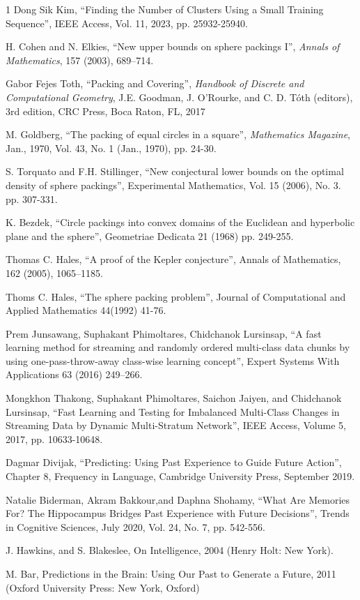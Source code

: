 \documentclass[lettersize,journal]{IEEEtran}
\begin{document}
\begin{thebibliography}{1}
Dong Sik Kim, ``Finding the Number of Clusters Using a Small Training Sequence'', IEEE Access, Vol. 11, 2023,
pp. 25932-25940.
  
H. Cohen and N. Elkies, ``New upper bounds on sphere packings I'', \textit{Annals of Mathematics}, 157 (2003), 
689–714.

Gabor Fejes Toth, ``Packing and Covering'', \textit{Handbook of Discrete and Computational Geometry},
J.E. Goodman, J. O'Rourke, and C. D. Tóth (editors), 3rd edition, CRC Press, Boca Raton, FL, 2017

M. Goldberg, ``The packing of equal circles in a square'', \textit{Mathematics Magazine}, Jan., 1970, 
Vol. 43, No. 1 (Jan., 1970), pp. 24-30.

S. Torquato and F.H. Stillinger, ``New conjectural lower bounds on the optimal density of sphere 
packings'', Experimental Mathematics, Vol. 15 (2006), No. 3. pp. 307-331.
 
K. Bezdek, ``Circle packings into convex domains of the Euclidean and hyperbolic plane and the sphere'', 
Geometriae Dedicata 21 (1968) pp. 249-255.

Thomas C. Hales, ``A proof of the Kepler conjecture'', Annals of Mathematics, 162 (2005), 1065–1185.

Thoms C. Hales, ``The sphere packing problem'', Journal of Computational and Applied Mathematics 44(1992) 41-76.

Prem Junsawang, Suphakant Phimoltares, Chidchanok Lursinsap, ``A fast learning method for streaming and 
randomly ordered multi-class data chunks by using one-pass-throw-away class-wise learning concept'',
Expert Systems With Applications 63 (2016) 249–266.

Mongkhon Thakong, Suphakant Phimoltares, Saichon Jaiyen, and Chidchanok Lursinsap, ``Fast Learning and 
Testing for Imbalanced Multi-Class Changes in Streaming Data by Dynamic Multi-Stratum Network'',
IEEE Access, Volume 5, 2017, pp. 10633-10648.

Dagmar Divijak, ``Predicting: Using Past Experience to Guide Future Action'', Chapter 8, Frequency in 
Language, Cambridge University Press, September 2019.

Natalie Biderman, Akram Bakkour,and Daphna Shohamy, ``What Are Memories For? The Hippocampus
Bridges Past Experience with Future Decisions'', Trends in Cognitive Sciences, July 2020, Vol. 24, No. 7,
pp. 542-556.

J. Hawkins, and S. Blakeslee, On Intelligence, 2004 (Henry Holt: New York).

M. Bar, Predictions in the Brain: Using Our Past to Generate a Future, 2011 (Oxford
University Press: New York, Oxford)


\end{thebibliography}
\end{document}
